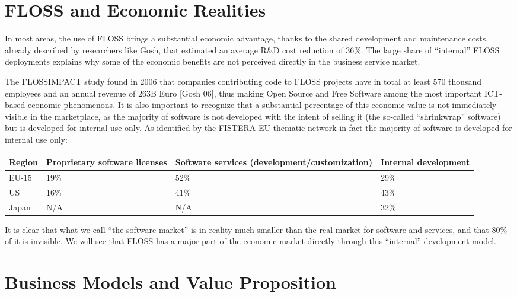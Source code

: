 \section*{FLOSS and Economic Realities}

In most areas, the use of FLOSS brings a substantial economic advantage,
thanks to the shared development and maintenance costs, already described by
researchers like Gosh, that estimated an average R\&D cost reduction of 36\%.
The large share of ``internal'' FLOSS deployments explains why some of the economic benefits are not perceived directly in the business service market.

The FLOSSIMPACT study found in 2006 that companies contributing
code to FLOSS projects have in total at least 570 thousand employees and an annual
revenue of 263B Euro [Gosh 06], thus making Open Source and Free Software among the most important ICT-based economic phenomenons. It is also important to recognize that a substantial percentage of this economic value is not immediately visible in the marketplace, as the majority of software is not developed with the intent of selling it (the so-called ``shrinkwrap'' software) but is developed for internal use only. As identified by the FISTERA EU thematic network in fact the majority of software is developed for internal use only:\newline
\begin{tabularx}{\textwidth}{|X|X|X|X|}
\hline
Region & Proprietary software licenses & Software services
(de\-vel\-op\-ment/\-cus\-tom\-i\-za\-ti\-on) & Internal development\\
\hline
EU-15 & 19\% & 52\% & 29\% \\
\hline
US & 16\% & 41\% & 43\% \\
\hline
Japan & N/A & N/A & 32\% \\
\hline
\end{tabularx}

It is clear that what we call ``the software market'' is in reality much smaller
than the real market for software and services, and that 80\% of it is
invisible. We will see that FLOSS has a major part of the economic market
directly through this ``internal'' development model.

\section*{Business Models and Value Proposition}

